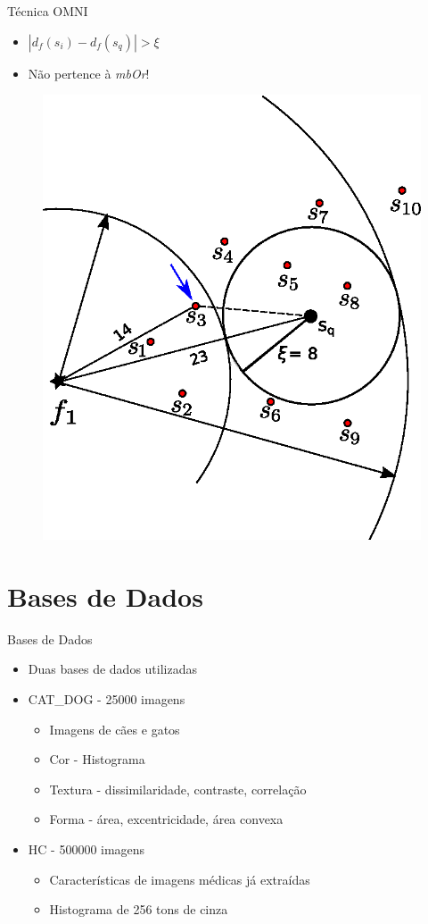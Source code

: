 \documentclass{beamer}
\begin{document}
\begin{frame}{Técnica OMNI}
	\begin{itemize}
	 \item $|d_f(s_i) - d_f(s_q)| > \xi$\newline
	 \item Não pertence à \textit{mbOr}!
	\end{itemize}

	\begin{figure}[H]
			\centering
			\includegraphics[width=.4\textwidth]{rg_ex2.eps}
	\end{figure}

\end{frame}

\section{Bases de Dados}

\begin{frame}{Bases de Dados}
  \begin{itemize}
   \item Duas bases de dados utilizadas\newline
  \item CAT\_DOG - 25000 imagens
      \begin{itemize}
       \item Imagens de cães e gatos
       \item Cor - Histograma
       \item Textura - dissimilaridade, contraste, correlação
       \item Forma - área, excentricidade, área convexa\newline
      \end{itemize}

  \item HC - 500000 imagens
      \begin{itemize}
	\item Características de imagens médicas já extraídas
	\item Histograma de 256 tons de cinza
      \end{itemize}
      
  \end{itemize}

\end{frame}
\end{document}
